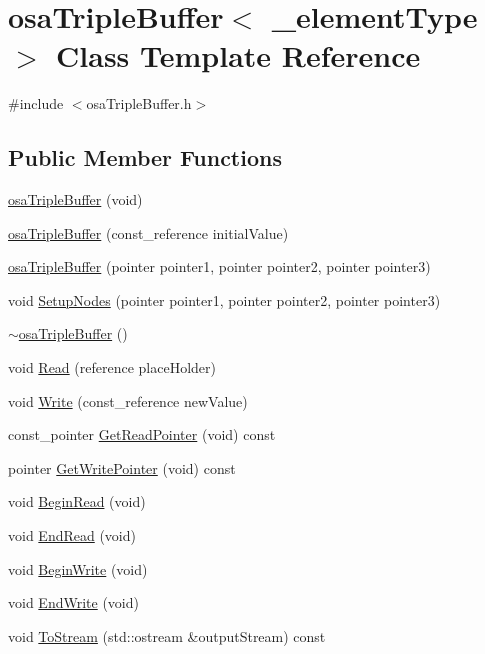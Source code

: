 \hypertarget{classosa_triple_buffer}{\section{osa\-Triple\-Buffer$<$ \-\_\-element\-Type $>$ Class Template Reference}
\label{classosa_triple_buffer}
}


{\ttfamily \#include $<$osa\-Triple\-Buffer.\-h$>$}

\subsection*{Public Member Functions}
\begin{DoxyCompactItemize}
\item 
\hyperlink{classosa_triple_buffer_af685c6dd30e1eb800ef6df3f8074ef1a}{osa\-Triple\-Buffer} (void)
\item 
\hyperlink{classosa_triple_buffer_ad60e01d3bf64e9d400107dc6a173a1e3}{osa\-Triple\-Buffer} (const\-\_\-reference initial\-Value)
\item 
\hyperlink{classosa_triple_buffer_a98293e4fbf7257c915c3cd349dd506b5}{osa\-Triple\-Buffer} (pointer pointer1, pointer pointer2, pointer pointer3)
\item 
void \hyperlink{classosa_triple_buffer_acf53979aa3445d7a18060c8ba3facc58}{Setup\-Nodes} (pointer pointer1, pointer pointer2, pointer pointer3)
\item 
\hyperlink{classosa_triple_buffer_a620796ad9891d61a53bc87c87a4796d7}{$\sim$osa\-Triple\-Buffer} ()
\item 
void \hyperlink{classosa_triple_buffer_a3f8542a0f8c276250f14411e85ff2d04}{Read} (reference place\-Holder)
\item 
void \hyperlink{classosa_triple_buffer_a9b988d139edf8aa2eb185917878b711c}{Write} (const\-\_\-reference new\-Value)
\item 
const\-\_\-pointer \hyperlink{classosa_triple_buffer_acce7b1e6b493242c69a7878ee2d2f255}{Get\-Read\-Pointer} (void) const 
\item 
pointer \hyperlink{classosa_triple_buffer_a883eb98a1b7416145c7f5c8081184ebe}{Get\-Write\-Pointer} (void) const 
\item 
void \hyperlink{classosa_triple_buffer_a60ba16dfa7b74ed88998792c195af383}{Begin\-Read} (void)
\item 
void \hyperlink{classosa_triple_buffer_aeafc6d3ce30c02aabd1549cdeb4b21f6}{End\-Read} (void)
\item 
void \hyperlink{classosa_triple_buffer_a59c6f1c56ffac365adf0e219783c9091}{Begin\-Write} (void)
\item 
void \hyperlink{classosa_triple_buffer_a1f71a564e41546875abae049db19dd54}{End\-Write} (void)
\item 
void \hyperlink{classosa_triple_buffer_ab6c93acaa40c01f845dc9f4556e571fa}{To\-Stream} (std\-::ostream \&output\-Stream) const 
\end{DoxyCompactItemize}
